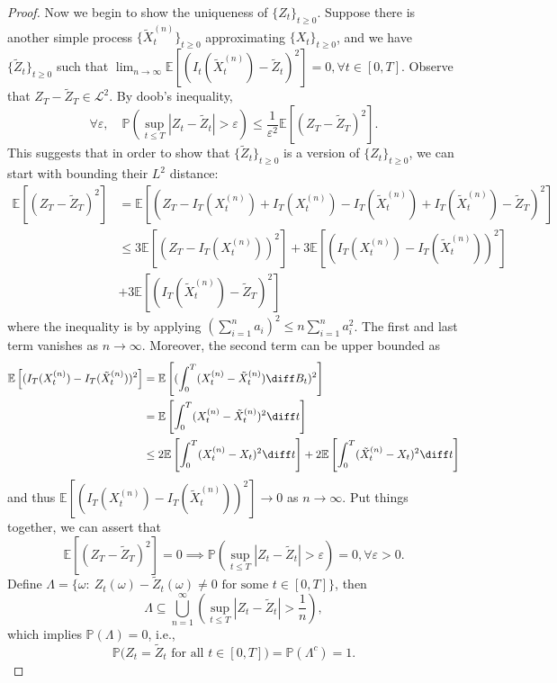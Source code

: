 \begin{proof}
Now we begin to show the uniqueness of $\{Z_t\}_{t\ge0}$.
Suppose there is another simple process $\{\tilde{X}_t^{(n)}\}_{t\ge0}$ approximating $\{X_t\}_{t\ge0}$, and we have $\{\tilde{Z}_t\}_{t\ge0}$ such that $\lim_{n\to\infty}\mathbb{E}\left[
(I_t(\tilde{X}_t^{(n)})-\tilde{Z}_t)^2
\right]=0,\forall t\in[0,T]$.
Observe that $Z_T-\tilde{Z}_T\in\mathcal{L}^2$. By doob's inequality,
\[
\forall\varepsilon,\quad
\mathbb{P}\left(
\sup_{t\le T}|Z_t - \tilde{Z}_t|>\varepsilon
\right)\le \frac{1}{\varepsilon^2}\mathbb{E}[(Z_T - \tilde{Z}_T)^2].
\]
This suggests that in order to show that $\{\tilde{Z}_t\}_{t\ge0}$ is a version of $\{Z_t\}_{t\ge0}$,
we can start with bounding their $L^2$ distance:
\begin{align*}
\mathbb{E}[(Z_T - \tilde{Z}_T)^2]&=\mathbb{E}[(Z_T - I_T({X}_t^{(n)}) + I_T({X}_t^{(n)})-I_T(\tilde{X}_t^{(n)})+I_T(\tilde{X}_t^{(n)})-\tilde{Z}_T)^2]\\
&\le 3\mathbb{E}\left[(Z_T - I_T({X}_t^{(n)}))^2\right]+3\mathbb{E}\left[(I_T({X}_t^{(n)})-I_T(\tilde{X}_t^{(n)}))^2\right]\\&+3\mathbb{E}\left[(I_T(\tilde{X}_t^{(n)})-\tilde{Z}_T)^2\right]
\end{align*}
where the inequality is by applying $(\sum_{i=1}^na_i)^2\le n\sum_{i=1}^na_i^2$.
The first and last term vanishes as $n\to\infty$.
Moreover, the second term can be upper bounded as
\begin{align*}
\mathbb{E}\left[(I_T({X}_t^{(n)})-I_T(\tilde{X}_t^{(n)}))^2\right]
&=\mathbb{E}\left[(\int_0^T({X}_t^{(n)}-\tilde{X}_t^{(n)})\diff B_t)^2\right]\\
&=\mathbb{E}\left[\int_0^T({X}_t^{(n)}-\tilde{X}_t^{(n)})^2\diff t\right]\\
&\le 2\mathbb{E}\left[\int_0^T({X}_t^{(n)}-X_t)^2\diff t\right]
+2\mathbb{E}\left[\int_0^T(\tilde{X}_t^{(n)}-X_t)^2\diff t\right]
\end{align*}
and thus $\mathbb{E}\left[(I_T({X}_t^{(n)})-I_T(\tilde{X}_t^{(n)}))^2\right]\to0$ as $n\to\infty$.
Put things together, we can assert that
\[
\mathbb{E}[(Z_T - \tilde{Z}_T)^2]=0\implies
\mathbb{P}\left(
\sup_{t\le T}|Z_t - \tilde{Z}_t|>\varepsilon
\right)=0,\forall\varepsilon>0.
\]
Define $\Lambda=\{\omega:~Z_t(\omega)-\tilde{Z}_t(\omega)\ne0\text{ for some }t\in[0,T]\}$, then
\[
\Lambda\subseteq\bigcup_{n=1}^\infty\left(
\sup_{t\le T}|Z_t - \tilde{Z}_t|>\frac{1}{n}
\right),
\]
which implies $\mathbb{P}(\Lambda)=0$, i.e., 
\[
\mathbb{P}\bigg(
\mbox{$Z_t=\tilde{Z}_t$ for all $t\in[0,T]$}
\bigg)=\mathbb{P}(\Lambda^c)=1.
\]
\end{proof}









